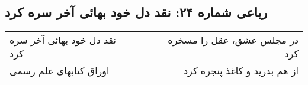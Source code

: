 \begin{center}
\section*{رباعی شماره ۲۴: نقد دل خود بهائی آخر سره کرد}
\label{sec:024}
\begin{longtable}{l p{0.5cm} r}
نقد دل خود بهائی آخر سره کرد
&&
در مجلس عشق، عقل را مسخره کرد
\\
اوراق کتابهای علم رسمی
&&
از هم بدرید و کاغذ پنجره کرد
\\
\end{longtable}
\end{center}
